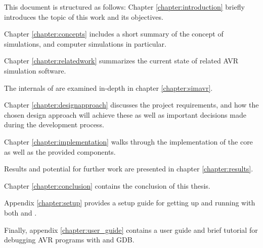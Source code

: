 This document is structured as follows: Chapter \ref{chapter:introduction} briefly
introduces the topic of this work and its objectives.

Chapter \ref{chapter:concepts} includes a short summary of the concept of simulations,
and computer simulations in particular.

Chapter \ref{chapter:relatedwork} summarizes the current state of related \ac{AVR}
simulation software.

The internals of \simavr are examined in-depth in chapter \ref{chapter:simavr}.

Chapter \ref{chapter:designapproach} discusses the project requirements, and
how the chosen design approach will achieve these as well as important decisions
made during the development process.

Chapter \ref{chapter:implementation} walks through the implementation of the
\qsimavr core as well as the provided components.

Results and potential for further work are presented in chapter \ref{chapter:results}.

Chapter \ref{chapter:conclusion} contains the conclusion of this thesis.

Appendix \ref{chapter:setup} provides a setup guide for getting up and running
with both \simavr and \qsimavr.

Finally, appendix \ref{chapter:user_guide} contains a \qsimavr user guide
and brief tutorial for debugging \ac{AVR} programs with \qsimavr and \ac{GDB}.
